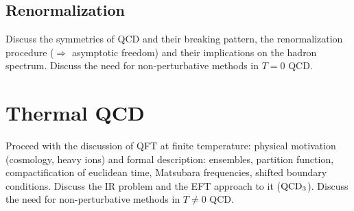 \subsection{Renormalization}

Discuss the symmetries
of QCD and their breaking pattern, the renormalization procedure ($\Rightarrow$
asymptotic freedom) and their implications on the hadron spectrum. Discuss the need
for non-perturbative methods in $T=0$ QCD.\\
\section{Thermal QCD}
Proceed with the discussion of QFT at finite temperature: physical motivation
(cosmology, heavy ions) and formal description: ensembles, partition function,
compactification of euclidean time, Matsubara frequencies, shifted boundary 
conditions. Discuss the IR problem and the EFT approach to it ($\rm QCD_3$). 
Discuss the need for non-perturbative methods in $T\neq 0$ QCD.
